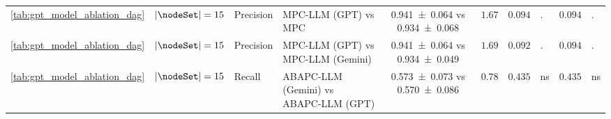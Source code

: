 \begin{table}[t]
{\begin{tabular}{cll l|c|r|rl|rl}
    \ref{tab:gpt_model_ablation_dag} & $|\nodeSet|=15$ & Precision & MPC-LLM (GPT) vs MPC & \num{0.941 +- 0.064} vs \num{0.934 +- 0.068} & $1.67$ & $0.094$ & \!\!\!. & $0.094$ & \!\!\!. \\
    \ref{tab:gpt_model_ablation_dag} & $|\nodeSet|=15$ & Precision & MPC-LLM (GPT) vs MPC-LLM (Gemini) & \num{0.941 +- 0.064} vs \num{0.934 +- 0.049} & $1.69$ & $0.092$ & \!\!\!. & $0.094$ & \!\!\!. \\
    \ref{tab:gpt_model_ablation_dag} & $|\nodeSet|=15$ & Recall & ABAPC-LLM (Gemini) vs ABAPC-LLM (GPT) & \num{0.573 +- 0.073} vs \num{0.570 +- 0.086} & $0.78$ & $0.435$ & \!\!\!ns & $0.435$ & \!\!\!ns \\
    \bottomrule
    \end{tabular}
    }
\end{table}
